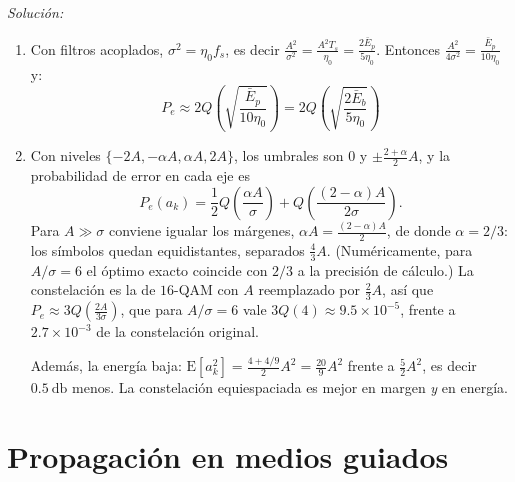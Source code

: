 \documentclass[a4paper,11pt]{article}
\newcommand{\E}[1]{\mathrm{E}\left[#1\right]}
\newenvironment{solucion}[1][]{
\noindent \large \textsl{Solución:} \ifthenelse{\equal{#1}{}}{}{\emph{(#1)}}

\smallskip
}{
\bigskip
}
\begin{document}
\begin{solucion}
\begin{enumerate}
                 \item Con filtros acoplados, $\sigma^2=\eta_0 f_s$, es decir $\frac{A^2}{\sigma^2}=\frac{A^2T_s}{\eta_0}=\frac{2\bar E_p}{5\eta_0}$. Entonces $\frac{A^2}{4\sigma^2}=\frac{\bar E_p}{10\eta_0}$ y:
                  \begin{equation*}
                        P_e \approx 2Q\left(\sqrt{\frac{\bar{E}_p}{10\eta_0}}\right) = 2Q\left(\sqrt{\frac{2\bar{E}_b}{5\eta_0}}\right)
                  \end{equation*}

                  \item Con niveles $\{-2A,-\alpha A,\alpha A,2A\}$, los umbrales son $0$ y $\pm\frac{2+\alpha}{2}A$, y la probabilidad de error en cada eje es
                   \begin{equation*}
                        P_e(a_k)=\frac12 Q\left(\frac{\alpha A}{\sigma}\right)+Q\left(\frac{(2-\alpha)A}{2\sigma}\right).
                   \end{equation*}
                   Para $A\gg\sigma$ conviene igualar los márgenes, $\alpha A=\frac{(2-\alpha)A}{2}$, de donde $\alpha=2/3$: los símbolos quedan equidistantes, separados $\frac43A$. (Numéricamente, para $A/\sigma=6$ el óptimo exacto coincide con $2/3$ a la precisión de cálculo.) La constelación es la de $16$-QAM con $A$ reemplazado por $\frac23A$, así que $P_e \approx 3Q\left(\frac{2A}{3\sigma}\right)$, que para $A/\sigma=6$ vale $3Q(4)\approx 9.5\times10^{-5}$, frente a $2.7\times10^{-3}$ de la constelación original.

                   Además, la energía baja: $\E{a_k^2}=\frac{4+4/9}{2}A^2=\frac{20}{9}A^2$ frente a $\frac52A^2$, es decir $0.5\ \unit{\decibel}$ menos. La constelación equiespaciada es mejor en margen \emph{y} en energía.
        \end{enumerate}
\end{solucion}

\section{Propagación en medios guiados}
\end{document}
